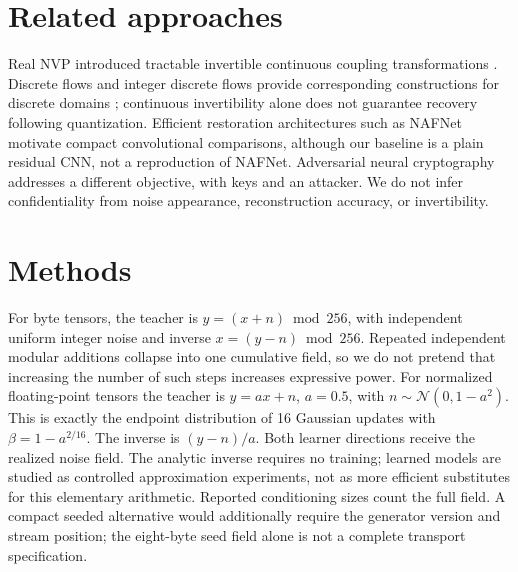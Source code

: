 \documentclass[10pt]{article}
\begin{document}
\section{Related approaches}
Real NVP introduced tractable invertible continuous coupling transformations
\cite{realnvp}. Discrete flows and integer discrete flows provide corresponding
constructions for discrete domains \cite{discrete,idf}; continuous invertibility
alone does not guarantee recovery following quantization. Efficient restoration
architectures such as NAFNet \cite{nafnet} motivate compact convolutional
comparisons, although our baseline is a plain residual CNN, not a reproduction of
NAFNet. Adversarial neural cryptography \cite{anc} addresses a different objective,
with keys and an attacker. We do not infer confidentiality from noise appearance,
reconstruction accuracy, or invertibility.

\section{Methods}
For byte tensors, the teacher is $y=(x+n)\bmod256$, with independent uniform
integer noise and inverse $x=(y-n)\bmod256$. Repeated independent modular additions
collapse into one cumulative field, so we do not pretend that increasing the
number of such steps increases expressive power. For normalized floating-point
tensors the teacher is $y=ax+n$, $a=0.5$, with
$n\sim\mathcal N(0,1-a^2)$. This is exactly the endpoint distribution of 16
Gaussian updates with $\beta=1-a^{2/16}$. The inverse is $(y-n)/a$.
Both learner directions receive the realized noise field. The analytic inverse
requires no training; learned models are studied as controlled approximation
experiments, not as more efficient substitutes for this elementary arithmetic.
Reported conditioning sizes count the full field. A compact seeded alternative
would additionally require the generator version and stream position; the
eight-byte seed field alone is not a complete transport specification.
\end{document}

